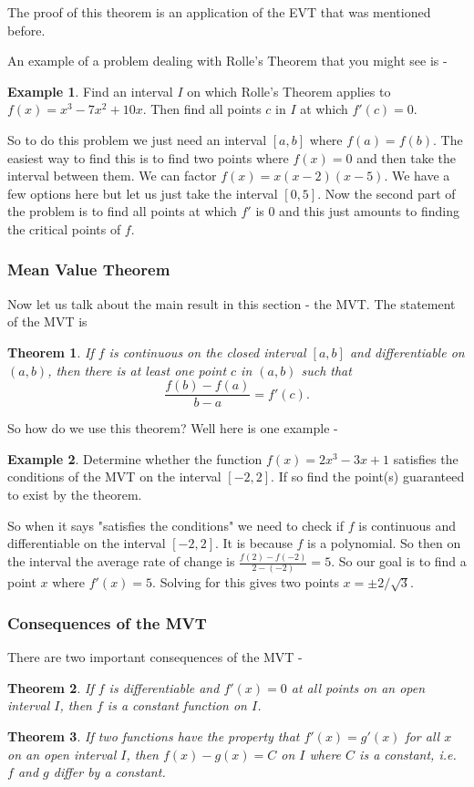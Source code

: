 \documentclass[12pt,reqno]{article}
\newtheorem{Theorem}{Theorem}
\theoremstyle{definition}
\newtheorem*{Example}{Example}
\begin{document}
The proof of this theorem is an application of the EVT that was mentioned before. 

An example of a problem dealing with Rolle's Theorem that you might see is -
\begin{Example}
	Find an interval $I$ on which Rolle's Theorem applies to $f(x) = x^3 - 7x^2 + 10x$. Then find all points $c$ in $I$ at which $f'(c) = 0$. 
	
	So to do this problem we just need an interval $[a, b]$ where $f(a) = f(b)$. The easiest way to find this is to find two points where $f(x) = 0$ and then take the interval between them. We can factor $f(x) = x(x - 2)(x - 5)$. We have a few options here but let us just take the interval $[0, 5]$. Now the second part of the problem is to find all points at which $f'$ is 0 and this just amounts to finding the critical points of $f$. 
\end{Example}

\subsubsection{Mean Value Theorem}

Now let us talk about the main result in this section - the MVT. The statement of the MVT is 
\begin{Theorem}
	If $f$ is continuous on the closed interval $[a, b]$ and differentiable on $(a, b)$, then there is at least one point $c$ in $(a, b)$ such that $$\frac{f(b) - f(a)}{b - a} = f'(c).$$
\end{Theorem}

So how do we use this theorem? Well here is one example - 
\begin{Example}
	Determine whether the function $f(x) = 2x^3 - 3x + 1$ satisfies the conditions of the MVT on the interval $[-2, 2]$. If so find the point(s) guaranteed to exist by the theorem. 
	
	So when it says "satisfies the conditions" we need to check if $f$ is continuous and differentiable on the interval $[-2, 2]$. It is because $f$ is a polynomial. So then on the interval the average rate of change is $\frac{f(2) - f(-2)}{2 - (-2)}  = 5$. So our goal is to find a point $x$ where $f'(x) = 5$. Solving for this gives two points $x = \pm 2/\sqrt{3}$. 
\end{Example}

\subsubsection{Consequences of the MVT} 

There are two important consequences of the MVT - 
\begin{Theorem}
	If $f$ is differentiable and $f'(x) = 0$ at all points on an open interval $I$, then $f$ is a constant function on $I$. 
\end{Theorem}

\begin{Theorem}
	If two functions have the property that $f'(x) = g'(x)$ for all $x$ on an open interval $I$, then $f(x) - g(x) = C$ on $I$ where $C$ is a constant, i.e. $f$ and $g$ differ by a constant. 
\end{Theorem}
\end{document}
